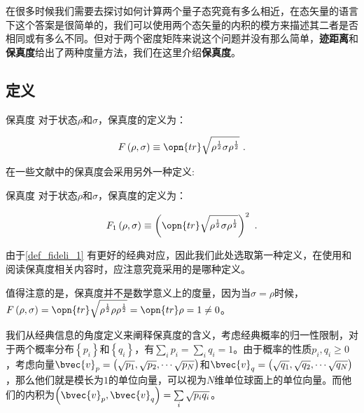 


在很多时候我们需要去探讨如何计算两个量子态究竟有多么相近，在态矢量的语言下这个答案是很简单的，我们可以使用两个态矢量的内积的模方来描述其二者是否相同或有多么不同。但对于两个密度矩阵来说这个问题并没有那么简单，\textbf{迹距离}和\textbf{保真度}给出了两种度量方法，我们在这里介绍\textbf{保真度}。

\subsection{定义}

\begin{definition}{保真度}\label{def_fideli_1}
对于状态$\rho$和$\sigma$，保真度的定义为：

\begin{equation}\label{eq_fideli_1}
F\left(\rho, \sigma\right)\equiv\opn{tr}\sqrt{\rho^{\frac{1}{2}}\sigma\rho^{\frac{1}{2}}}~.
\end{equation}

\end{definition}

在一些文献中的保真度会采用另外一种定义:

\begin{definition}{保真度}
对于状态$\rho$和$\sigma$，保真度的定义为：

\begin{equation}
F_1\left(\rho, \sigma\right)\equiv\left(\opn{tr}\sqrt{\rho^{\frac{1}{2}}\sigma\rho^{\frac{1}{2}}}\right)^2~.
\end{equation}
\end{definition}

由于\autoref{def_fideli_1} 有更好的经典对应，因此我们此处选取第一种定义，在使用和阅读保真度相关内容时，应注意究竟采用的是哪种定义。

值得注意的是，保真度并不是数学意义上的度量，因为当$\sigma = \rho$时候，$F\left(\rho, \sigma\right) = \opn{tr}\sqrt{\rho^{\frac{1}{2}}\rho\rho^{\frac{1}{2}}} = \opn{tr}\rho = 1 \neq 0$。

我们从经典信息的角度定义来阐释保真度的含义，考虑经典概率的归一性限制，对于两个概率分布$\left\{p_i\right\}$和$\left\{q_i\right\}$，有$\sum\limits_i p_i = \sum\limits_i q_i = 1$。由于概率的性质$p_i,q_i\geqslant 0$，考虑向量$\bvec{v}_p = \left( \sqrt{p_1},\sqrt{p_2},\cdots\sqrt{p_N}\right)$和$\bvec{v}_q = \left( \sqrt{q_1},\sqrt{q_2},\cdots\sqrt{q_N}\right)$，那么他们就是模长为$1$的单位向量，可以视为$N$维单位球面上的单位向量。而他们的内积为$\left(\bvec{v}_p,\bvec{v}_q\right) = \sum\limits_i\sqrt{p_iq_i}$。

